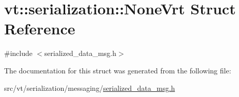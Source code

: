 \hypertarget{structvt_1_1serialization_1_1_none_vrt}{}\section{vt\+:\+:serialization\+:\+:None\+Vrt Struct Reference}
\label{structvt_1_1serialization_1_1_none_vrt}


{\ttfamily \#include $<$serialized\+\_\+data\+\_\+msg.\+h$>$}



The documentation for this struct was generated from the following file\+:\begin{DoxyCompactItemize}
\item 
src/vt/serialization/messaging/\hyperlink{serialized__data__msg_8h}{serialized\+\_\+data\+\_\+msg.\+h}\end{DoxyCompactItemize}
